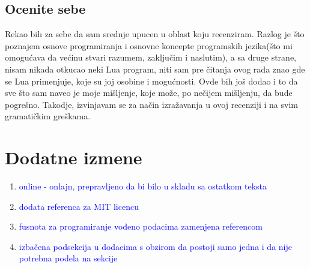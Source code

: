 \documentclass[a4paper]{report}
\newcommand{\odgovorAutora}[1]{\textcolor{blue}{#1}}
\begin{document}
\section{Ocenite sebe}

Rekao bih za sebe da sam srednje upucen u oblast koju recenziram. Razlog je \v sto poznajem osnove programiranja i
osnovne koncepte programskih jezika(\v sto mi omogu\' cava da ve\' cinu stvari razumem, zaklju\v cim i naslutim), a sa druge strane,
nisam nikada otkucao neki Lua program, niti sam pre \v citanja ovog rada znao gde se Lua primenjuje, koje su joj osobine i mogu\' cnosti. Ovde bih jo\v s dodao i to
da sve \v sto sam naveo je moje mi\v sljenje, koje mo\v ze, po ne\v cijem mi\v sljenju, da bude pogre\v sno. Takodje, izvinjavam se za na\v cin izra\v zavanja u ovoj recenziji i na svim gramati\v ckim gre\v skama.


\chapter{Dodatne izmene}
\begin{enumerate}
\item \odgovorAutora{online - onlajn, prepravljeno da bi bilo u skladu sa ostatkom teksta}
\item \odgovorAutora{dodata referenca za MIT licencu}
\item \odgovorAutora{fusnota za programiranje vođeno podacima zamenjena referencom}
\item \odgovorAutora{izbačena podsekcija u dodacima s obzirom da postoji samo jedna i da nije potrebna podela na sekcije}
\end{enumerate} 
\end{document}

